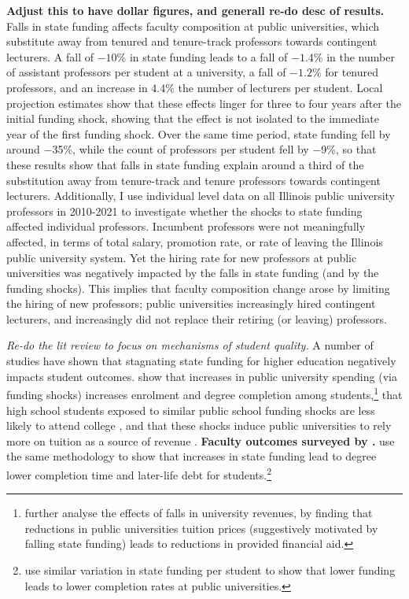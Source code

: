 \textbf{Adjust this to have dollar figures, and generall re-do desc of results.}
Falls in state funding affects faculty composition at public universities, which substitute away from tenured and tenure-track professors towards contingent lecturers.
A fall of $-10$\% in state funding leads to a fall of $-1.4$\% in the number of assistant professors per student at a university, a fall of $-1.2$\% for tenured professors, and an increase in 4.4\% the number of lecturers per student.
Local projection estimates show that these effects linger for three to four years after the initial funding shock, showing that the effect is not isolated to the immediate year of the first funding shock. 
Over the same time period, state funding fell by around $-$35\%, while the count of professors per student fell by $-$9\%, so that these results show that falls in state funding explain around a third of the substitution away from tenure-track and tenure professors towards contingent lecturers.
Additionally, I use individual level data on all Illinois public university professors in 2010-2021 to investigate whether the shocks to state funding affected individual professors.
Incumbent professors were not meaningfully affected, in terms of total salary, promotion rate, or rate of leaving the Illinois public university system.
Yet the hiring rate for new professors at public universities was negatively impacted by the falls in state funding (and by the funding shocks).
This implies that faculty composition change arose by limiting the hiring of new professors; public universities increasingly hired contingent lecturers, and increasingly did not replace their retiring (or leaving) professors.

\textit{Re-do the lit review to focus on mechanisms of student quality.}
A number of studies have shown that stagnating state funding for higher education negatively impacts student outcomes.
\cite{NBERw23736} show that increases in public university spending (via funding shocks) increases enrolment and degree completion among students,\footnote{
    \cite{miller2022making} further analyse the effects of falls in university revenues, by finding that reductions in public universities tuition prices (suggestively motivated by falling state funding) leads to reductions in provided financial aid.
}
that high school students exposed to similar public school funding shocks are less likely to attend college \citep{jackson2021school}, and that these shocks induce public universities to rely more on tuition as a source of revenue \citep{bound2019public}.
\textbf{Faculty outcomes surveyed by \cite{ehrenberg2003studying}.}
\cite{NBERw27885} use the same methodology to show that increases in state funding lead to degree lower completion time and later-life debt for students.\footnote{
    \cite{bound2007cohort} use similar variation in state funding per student to show that lower funding leads to lower completion rates at public universities.
}

